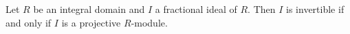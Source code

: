 Let $R$ be an integral domain and $I$ a fractional ideal of $R$. Then $I$ is invertible if and only if $I$ is a projective $R$-module.
